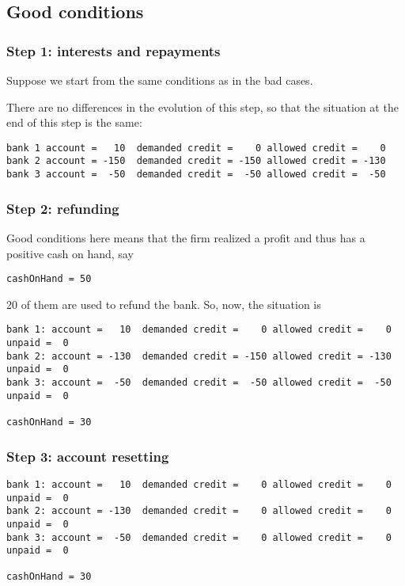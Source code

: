 \documentclass{article}
\begin{document}
\subsection{Good conditions}
	\subsubsection*{Step 1: interests and repayments}
	Suppose we start from the same conditions as in the bad cases.

	There are no differences in the evolution of this step, so that the situation at the end of this step is the same:
\begin{verbatim}
bank 1 account =   10  demanded credit =    0 allowed credit =    0
bank 2 account = -150  demanded credit = -150 allowed credit = -130 
bank 3 account =  -50  demanded credit =  -50 allowed credit =  -50
\end{verbatim}


	\subsubsection*{Step 2: refunding}
	Good conditions here means that the firm realized a profit and thus has a positive cash on hand, say

	\verb+cashOnHand = 50+

20 of them are used to refund the bank. So, now, the situation is 

\begin{verbatim}
bank 1: account =   10  demanded credit =    0 allowed credit =    0 unpaid =  0
bank 2: account = -130  demanded credit = -150 allowed credit = -130 unpaid =  0
bank 3: account =  -50  demanded credit =  -50 allowed credit =  -50 unpaid =  0

cashOnHand = 30
\end{verbatim}



	\subsubsection*{Step 3: account resetting}

\begin{verbatim}
bank 1: account =   10  demanded credit =    0 allowed credit =    0 unpaid =  0
bank 2: account = -130  demanded credit =    0 allowed credit =    0 unpaid =  0
bank 3: account =  -50  demanded credit =    0 allowed credit =    0 unpaid =  0

cashOnHand = 30
\end{verbatim}
\end{document}
